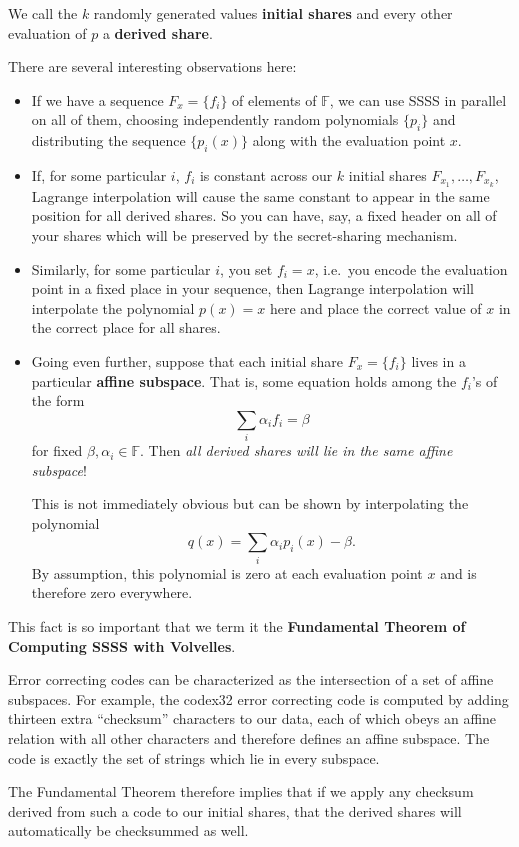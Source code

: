 \documentclass[letterpaper]{article}
\begin{document}
We call the $k$ randomly generated values \textbf{initial shares} and
every other evaluation of $p$ a \textbf{derived share}.

There are several interesting observations here:
\begin{itemize}
\item If we have a sequence $F_x = \{f_i\}$ of elements of $\mathbb{F}$, we can use
SSSS in parallel on all of them, choosing independently random polynomials
$\{p_i\}$ and distributing the sequence $\{p_i(x)\}$ along with the evaluation
point $x$.
\item If, for some particular $i$, $f_i$ is constant across our $k$ initial
shares $F_{x_1},\ldots,F_{x_k}$, Lagrange interpolation will cause the same
constant to appear in the same position for all derived shares. So you can
have, say, a fixed header on all of your shares which will be preserved by
the secret-sharing mechanism.
\item Similarly, for some particular $i$, you set $f_i=x$, i.e.~you encode the
evaluation point in a fixed place in your sequence, then Lagrange interpolation
will interpolate the polynomial $p(x) = x$ here and place the correct value
of $x$ in the correct place for all shares.
\item Going even further, suppose that each initial share $F_x=\{f_i\}$ lives
in a particular \textbf{affine subspace}. That is, some equation holds among
the $f_i$'s of the form
\[ \sum_i \alpha_i f_i = \beta \]
for fixed $\beta,\alpha_i\in \mathbb{F}$. Then \emph{all derived shares will
lie in the same affine subspace}!

This is not immediately obvious but can be shown by interpolating the polynomial
    \[ q(x) = \sum_i \alpha_i p_i(x) - \beta. \]
By assumption, this polynomial is zero at each evaluation point $x$ and is
therefore zero everywhere.
\end{itemize}

This fact is so important that we term it the \textbf{Fundamental Theorem of
Computing SSSS with Volvelles}.

Error correcting codes can be characterized as the intersection of a set of affine
subspaces. For example, the codex32 error correcting code is computed by adding
thirteen extra ``checksum'' characters to our data, each of which obeys an affine
relation with all other characters and therefore defines an affine subspace.
The code is exactly the set of strings which lie in every subspace.

The Fundamental Theorem therefore implies that if we apply any checksum derived from
such a code to our initial shares, that the derived shares will automatically
be checksummed as well.
\end{document}
